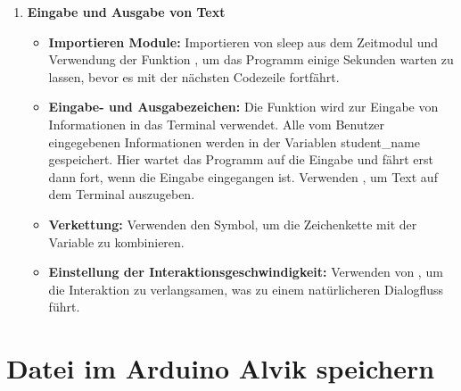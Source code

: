	{
	\label{Eingabetext}	
	{	\pythonstyle
		}
}
\begin{enumerate}
	\item \textbf{Eingabe und Ausgabe von Text}
	\begin{itemize}
		\item \textbf{Importieren Module:} Importieren von sleep aus dem Zeitmodul und Verwendung der Funktion , um das Programm einige Sekunden warten zu lassen, bevor es mit der nächsten Codezeile fortfährt.
		\item \textbf{Eingabe- und Ausgabezeichen:} Die Funktion  wird zur Eingabe von Informationen in das Terminal verwendet. Alle vom Benutzer eingegebenen Informationen werden in der Variablen student\_name gespeichert. Hier wartet das Programm auf die Eingabe und fährt erst dann fort, wenn die Eingabe eingegangen ist. Verwenden , um Text auf dem Terminal auszugeben.
		\item \textbf{Verkettung:} Verwenden den \PYTHON{+} Symbol, um die Zeichenkette mit der Variable  zu kombinieren.
		\item \textbf{Einstellung der Interaktionsgeschwindigkeit:} Verwenden von , um die Interaktion zu verlangsamen, was zu einem natürlicheren Dialogfluss führt.
		
	\end{itemize}
\end{enumerate}	

\section{Datei im Arduino Alvik speichern}

